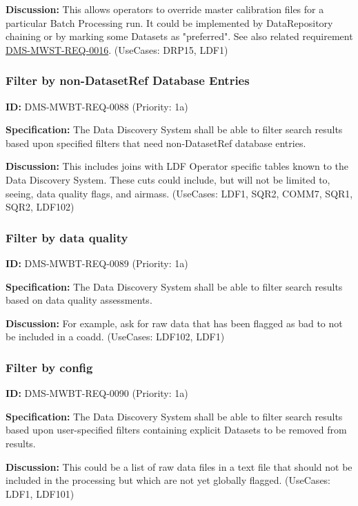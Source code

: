 \documentclass[SE,toc,lsstdraft]{lsstdoc}
\begin{document}
\textbf{Discussion:}
This allows operators to override master calibration files for a particular Batch Processing run. It could be implemented by DataRepository chaining or by marking some Datasets as "preferred". See also related requirement \hyperref[DMS-MWST-REQ-0016]{DMS-MWST-REQ-0016}. (UseCases: DRP15, LDF1)

\subsubsection{Filter by non-DatasetRef Database Entries}

\label{DMS-MWBT-REQ-0088}
\textbf{ID:} DMS-MWBT-REQ-0088 (Priority: 1a)

\textbf{Specification:}
The Data Discovery System shall be able to filter search results based upon specified filters that need non-DatasetRef database entries.

\textbf{Discussion:}
This includes joins with LDF Operator specific tables known to the Data Discovery System. These cuts could include, but will not be limited to, seeing, data quality flags, and airmass. (UseCases: LDF1, SQR2, COMM7, SQR1, SQR2, LDF102)

\subsubsection{Filter by data quality}

\label{DMS-MWBT-REQ-0089}
\textbf{ID:} DMS-MWBT-REQ-0089 (Priority: 1a)

\textbf{Specification:}
The Data Discovery System shall be able to filter search results based on data quality assessments.

\textbf{Discussion:}
For example, ask for raw data that has been flagged as bad to not be included in a coadd. (UseCases: LDF102, LDF1)

\subsubsection{Filter by config}

\label{DMS-MWBT-REQ-0090}
\textbf{ID:} DMS-MWBT-REQ-0090 (Priority: 1a)

\textbf{Specification:}
The Data Discovery System shall be able to filter search results based upon user-specified filters containing explicit Datasets to be removed from results.

\textbf{Discussion:}
This could be a list of raw data files in a text file that should not be included in the processing but which are not yet globally flagged. (UseCases: LDF1, LDF101)
\end{document}
